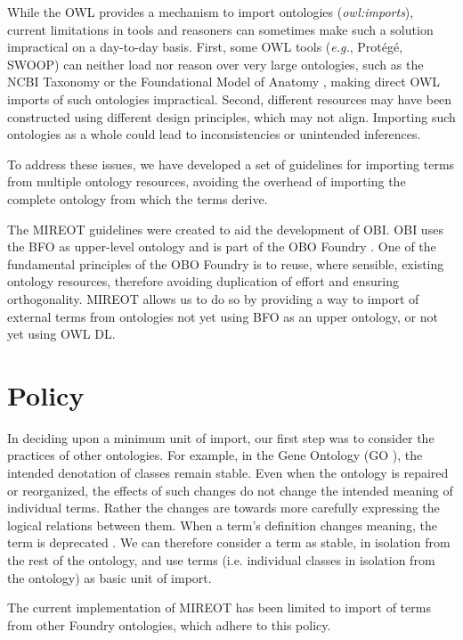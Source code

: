 \documentclass[a4paper,10pt,twocolumn]{article}
\begin{document}
While the \ac{OWL} \cite{RefWorks:1506} provides a mechanism to import ontologies (\emph{owl:imports}), current limitations in tools and reasoners can sometimes make such a solution impractical on a day-to-day basis.
First, some OWL tools (\emph{e.g.}, Prot\'eg\'e, SWOOP) can neither load nor reason over very large ontologies, such as the NCBI Taxonomy \cite{RefWorks:1502} or the Foundational Model of Anatomy \cite{RefWorks:1558}, making direct \ac{OWL} imports of such ontologies impractical. 
Second, different resources may have been constructed using different design principles, which may not align.
Importing such ontologies as a whole could lead to inconsistencies or unintended inferences.

To address these issues, we have developed a set of guidelines for importing terms from multiple ontology resources, avoiding the overhead of importing the complete ontology from which the terms derive. 

The \ac{MIREOT} guidelines were created to aid the development of \ac{OBI}\cite{RefWorks:1507}.
\ac{OBI} uses the \ac{BFO} \cite{RefWorks:1557} as upper-level ontology and is part of the \ac{OBO} Foundry \cite{RefWorks:1472}. 
One of the fundamental principles of the \ac{OBO} Foundry is to reuse, where sensible, existing ontology resources, therefore avoiding duplication of effort and ensuring orthogonality.
\ac{MIREOT} allows us to do so by providing a way to import of external terms from ontologies not yet using BFO as an upper ontology, or not yet using OWL DL.


\section*{Policy}

In deciding upon a minimum unit of import, our first step was to consider the practices of other ontologies.
For example, in the Gene Ontology (GO \cite{RefWorks:79}), the intended denotation of classes remain stable.
Even when the ontology is repaired or reorganized, the effects of such changes do not change the intended meaning of individual terms.
Rather the changes are towards more carefully expressing the logical relations between them.
When a term's definition changes meaning, the term is deprecated \cite{RefWorks:1560}.
We can therefore consider a term as stable, in isolation from the rest of the ontology, and use terms (i.e. individual classes in isolation from the ontology) as basic unit of import.

The current implementation of \ac{MIREOT} has been limited to import of terms from other Foundry ontologies, which adhere to this policy.
\end{document}
